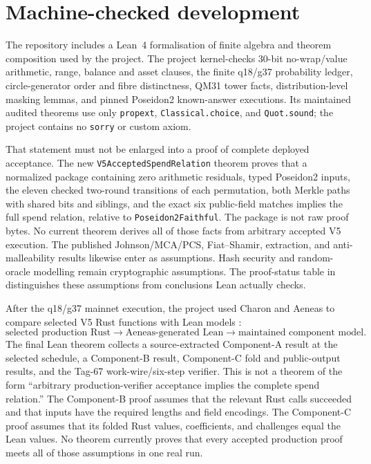 \section{Machine-checked development}
\label{sec:formalization}

The repository includes a Lean~4 formalisation
\cite{deMouraUllrich2021Lean4} of finite algebra and theorem composition used
by the project.  The  project kernel-checks 30-bit
no-wrap/value arithmetic, range, balance and asset clauses, the finite
q18/g37 probability ledger, circle-generator order and fibre distinctness,
QM31 tower facts, distribution-level masking lemmas, and pinned Poseidon2
known-answer executions.  Its maintained audited theorems use only
\texttt{propext}, \texttt{Classical.choice}, and \texttt{Quot.sound}; the
project contains no \texttt{sorry} or custom axiom.

That statement must not be enlarged into a proof of complete deployed
acceptance.  The new \texttt{V5AcceptedSpendRelation} theorem proves that a
normalized package containing zero arithmetic residuals, typed Poseidon2
inputs, the eleven checked two-round transitions of each permutation, both
Merkle paths with shared bits and siblings, and the exact six public-field
matches implies the full spend relation, relative to
\texttt{Poseidon2Faithful}.  The package is not raw proof bytes.  No current
theorem derives all of those facts from arbitrary accepted V5 execution.  The
published Johnson/MCA/PCS, Fiat--Shamir, extraction, and anti-malleability
results likewise enter as assumptions.
Hash security and random-oracle modelling remain cryptographic assumptions.
The proof-status table in  distinguishes these
assumptions from conclusions Lean actually checks.

After the q18/g37 mainnet execution, the project used Charon and Aeneas to
compare selected V5 Rust functions with Lean models
\cite{HoProtzenko2022Aeneas}:
\[
  \text{selected production Rust}
  \longrightarrow
  \text{Aeneas-generated Lean}
  \longrightarrow
  \text{maintained component model}.
\]
The final Lean theorem collects a source-extracted Component-A result at the
selected schedule, a Component-B result, Component-C fold and public-output
results, and the Tag-67 work-wire/six-step verifier.  This is not a theorem of the form
``arbitrary production-verifier acceptance implies the complete spend
relation.''  The Component-B proof assumes that the relevant Rust calls
succeeded and that inputs have the required lengths and field encodings.  The
Component-C proof assumes that its folded Rust values, coefficients, and
challenges equal the Lean values.  No theorem currently proves that every
accepted production proof meets all of those assumptions in one real run.

